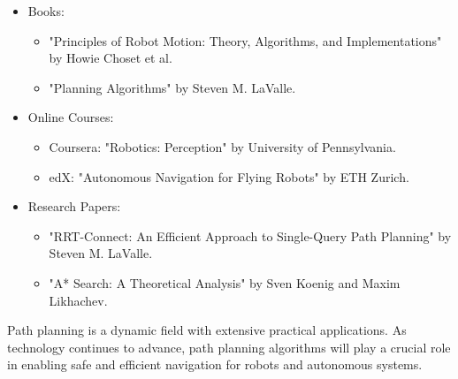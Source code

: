 \documentclass{article}
\begin{document}
\begin{itemize}
\item Books:
\begin{itemize}
\item "Principles of Robot Motion: Theory, Algorithms, and Implementations" by Howie Choset et al.
\item "Planning Algorithms" by Steven M. LaValle.
\end{itemize}
\item Online Courses:
\begin{itemize}
\item Coursera: "Robotics: Perception" by University of Pennsylvania.
\item edX: "Autonomous Navigation for Flying Robots" by ETH Zurich.
\end{itemize}
\item Research Papers:
\begin{itemize}
\item "RRT-Connect: An Efficient Approach to Single-Query Path Planning" by Steven M. LaValle.
\item "A* Search: A Theoretical Analysis" by Sven Koenig and Maxim Likhachev.
\end{itemize}
\end{itemize}

Path planning is a dynamic field with extensive practical applications. As technology continues to advance, path planning algorithms will play a crucial role in enabling safe and efficient navigation for robots and autonomous systems.
\end{document}
